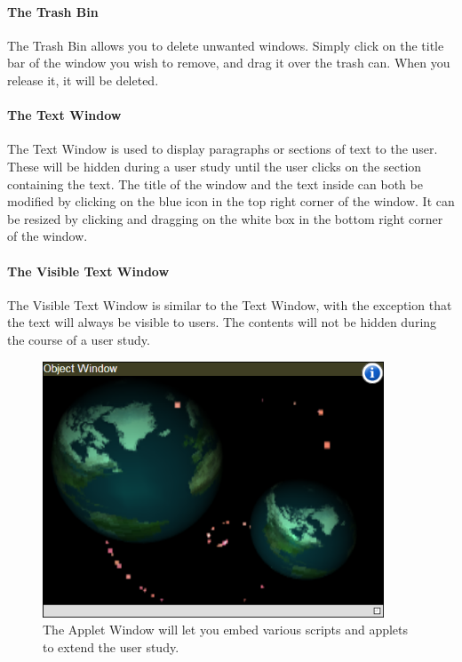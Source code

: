 \documentclass[article]{ij4uq}              %
\begin{document}
\paragraph{The Trash Bin}

The Trash Bin allows you to delete unwanted windows. Simply click on the title bar of the window you wish to remove, and drag it over the trash can. When you release it, it will be deleted.

\paragraph{The Text Window}
The Text Window is used to display paragraphs or sections of text to the user. These will be hidden during a user study until the user clicks on the section containing the text. The title of the window and the text inside can both be modified by clicking on the blue icon in the top right corner of the window. It can be resized by clicking and dragging on the white box in the bottom right corner of the window.

\paragraph{The Visible Text Window}
The Visible Text Window is similar to the Text Window, with the exception that the text will always be visible to users.  The contents will not be hidden during the course of a user study.

\begin{figure}[h!]
 \centering
 \includegraphics[width=4.0in]{figures/webgl.png}
 \caption{The Applet Window will let you embed various scripts and applets to extend the user study.}
 \label{fig:webgl}
\end{figure}
\FloatBarrier
\end{document}
